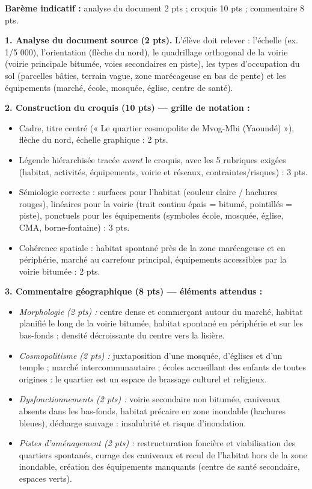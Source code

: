 \documentclass[11pt]{article}
\begin{document}
\begin{corrige}
\textbf{Barème indicatif :} analyse du document 2 pts ; croquis 10 pts ; commentaire 8 pts.

\textbf{1. Analyse du document source (2 pts).} L'élève doit relever : l'échelle (ex. 1/5 000), l'orientation (flèche du nord), le quadrillage orthogonal de la voirie (voirie principale bitumée, voies secondaires en piste), les types d'occupation du sol (parcelles bâties, terrain vague, zone marécageuse en bas de pente) et les équipements (marché, école, mosquée, église, centre de santé).

\textbf{2. Construction du croquis (10 pts) — grille de notation :}
\begin{itemize}
    \item Cadre, titre centré (« Le quartier cosmopolite de Mvog-Mbi (Yaoundé) »), flèche du nord, échelle graphique : 2 pts.
    \item Légende hiérarchisée tracée \emph{avant} le croquis, avec les 5 rubriques exigées (habitat, activités, équipements, voirie et réseaux, contraintes/risques) : 3 pts.
    \item Sémiologie correcte : surfaces pour l'habitat (couleur claire / hachures rouges), linéaires pour la voirie (trait continu épais = bitumé, pointillés = piste), ponctuels pour les équipements (symboles école, mosquée, église, CMA, borne-fontaine) : 3 pts.
    \item Cohérence spatiale : habitat spontané près de la zone marécageuse et en périphérie, marché au carrefour principal, équipements accessibles par la voirie bitumée : 2 pts.
\end{itemize}

\textbf{3. Commentaire géographique (8 pts) — éléments attendus :}
\begin{itemize}
    \item \emph{Morphologie (2 pts) :} centre dense et commerçant autour du marché, habitat planifié le long de la voirie bitumée, habitat spontané en périphérie et sur les bas-fonds ; densité décroissante du centre vers la lisière.
    \item \emph{Cosmopolitisme (2 pts) :} juxtaposition d'une mosquée, d'églises et d'un temple ; marché intercommunautaire ; écoles accueillant des enfants de toutes origines : le quartier est un espace de brassage culturel et religieux.
    \item \emph{Dysfonctionnements (2 pts) :} voirie secondaire non bitumée, caniveaux absents dans les bas-fonds, habitat précaire en zone inondable (hachures bleues), décharge sauvage : insalubrité et risque d'inondation.
    \item \emph{Pistes d'aménagement (2 pts) :} restructuration foncière et viabilisation des quartiers spontanés, curage des caniveaux et recul de l'habitat hors de la zone inondable, création des équipements manquants (centre de santé secondaire, espaces verts).
\end{itemize}


\end{corrige}
\end{document}
